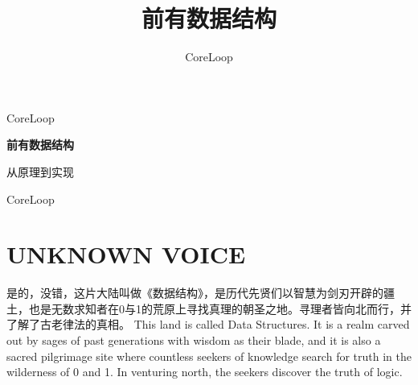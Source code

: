 \documentclass[twoside]{ctexbook}
\title{前有数据结构}
\author{CoreLoop}
\date{}
\begin{document}
\begin{titlepage}
    \thispagestyle{empty}


    \vspace*{3.5cm}

    \begin{center}
        {\Large\color{blue!65!black}
            CoreLoop
        }

        \vspace{2cm}

        {\Huge\bfseries
            前有数据结构
        }

        \vspace{1cm}

        {\large
            从原理到实现
        }

        \vspace{2.5cm}


        \vfill

        {\large CoreLoop}
    \end{center}
\end{titlepage}

\frontmatter


 
\begingroup
\let\cleardoublepage\clearpage
\chapter*{UNKNOWN VOICE}
\endgroup
\bilingual
{是的，没错，这片大陆叫做《数据结构》，是历代先贤们以智慧为剑刃开辟的疆土，也是无数求知者在0与1的荒原上寻找真理的朝圣之地。寻理者皆向北而行，并了解了古老律法的真相。}
{This land is called Data Structures. It is a realm carved out by sages of past generations with wisdom as their blade, and it is also a sacred pilgrimage 
site where countless seekers of knowledge search for truth in the wilderness of 0 and 1. In venturing north, the seekers discover the truth of logic.}
\end{document}
